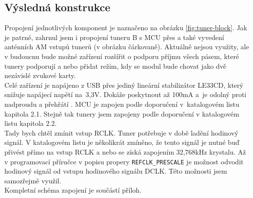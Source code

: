 \subsection{Výsledná konstrukce}
\label{subsec:konstrukce}

Propojení jednotlivých komponent je naznačeno na obrázku \ref{fig:tuner-block}. Jak je patrné, zahrnul jsem i propojení tuneru B s MCU přes \iis a také vyvedení anténních AM vstupů tunerů (v obrázku čárkovaně). Aktuálně nejsou využity, ale v budoucnu bude možné zařízení rozšířit o podporu příjmu všech pásem, které tunery podporují a nebo přidat režim, kdy se modul bude chovat jako dvě nezávislé zvukové karty.\\
Celé zařízení je napájeno z USB přes jediný lineární stabilizátor LE33CD, který snižuje napájecí napětí na~3,3V. Dokáže poskytnout až 100mA a~je odolný proti nadproudu a přehřátí \cite{le}. MCU je zapojen podle doporučení v~katalogovém listu \cite{pic} kapitola 2.1. Stejně tak tunery jsem zapojeny podle doporučení v katalogovém listu \cite{tuner-datasheet} kapitola 2.2.\\
 Tady bych chtěl zmínit vstup RCLK. Tuner potřebuje v době ladění hodinový signál. V katalogovém listu je několikrát zmíněno, že tento signál je nutné buď přivést přímo na vstup RCLK a nebo se získá zapojením 32,768kHz krystalu. Až v programovací příručce \cite{tuner-programing} v popisu propery \verb|REFCLK_PRESCALE| je možnost odvodit hodinový signál od vstupu hodinového signálu \iis DCLK. Této možnosti jsem samozřejmě využil. \\
Kompletní schéma zapojení je součástí příloh.
